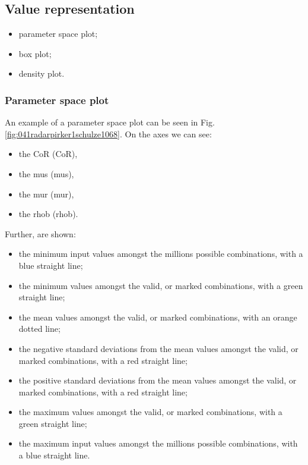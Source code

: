 \subsection{Value representation}
\label{subsec:valuerepresentation}

\begin{itemize}
  \item{parameter space plot;}
  \item{box plot;}
  \item{density plot.}
\end{itemize}

\subsubsection{Parameter space plot}
\label{subsubsec:parameterspaceplot}

An example of a parameter space plot can be seen
in Fig. \ref{fig:041radarpirker1schulze1068}.
On the axes we can see:
\begin{itemize}
  \item{the \acl{CoR} (\acs{CoR}),}
  \item{the \acl{mus} (\acs{mus}),}
  \item{the \acl{mur} (\acs{mur}),}  
  \item{the \acl{rhob} (\acs{rhob}).}
\end{itemize}
Further, are shown:
\begin{itemize}
  \item{the minimum input values amongst the millions possible combinations,
  with a blue straight line;}
  \item{the minimum values amongst the valid, or marked combinations, with a
  green straight line;}
  \item{the mean values amongst the valid, or marked combinations, with an
  orange dotted line;}
  \item{the negative standard deviations from the mean values amongst the valid,
  or marked combinations, with a red straight line;}
  \item{the positive standard deviations from the mean values amongst the valid,
  or marked combinations, with a red straight line;}  
  \item{the maximum values amongst the valid, or marked combinations, with a
  green straight line;}
  \item{the maximum input values amongst the millions possible combinations,
  with a blue straight line.}  
\end{itemize}

